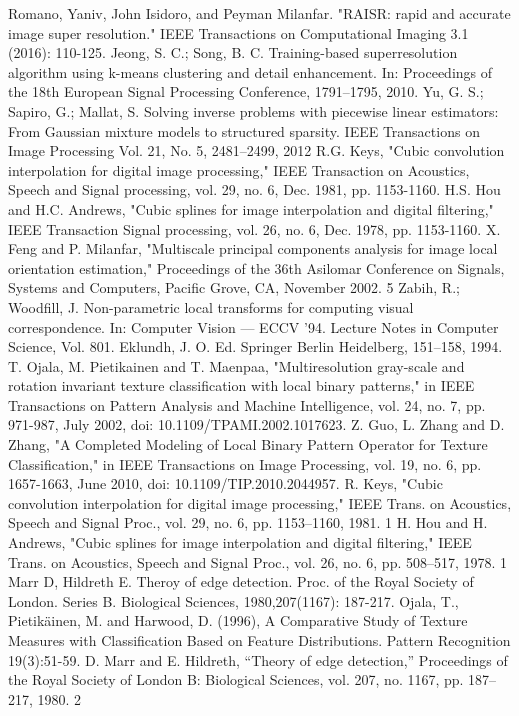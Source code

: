 \documentclass[12pt, a4paper, oneside]{ctexbook}
\begin{document}
\newpage
\begin{thebibliography}{99}
Romano, Yaniv, John Isidoro, and Peyman Milanfar. "RAISR: rapid and accurate image super resolution." IEEE Transactions on Computational Imaging 3.1 (2016): 110-125.
Jeong, S. C.; Song, B. C. Training-based superresolution algorithm using k-means clustering and detail enhancement. In: Proceedings of the 18th European Signal Processing Conference, 1791–1795, 2010.
 Yu, G. S.; Sapiro, G.; Mallat, S. Solving inverse problems with piecewise linear estimators: From Gaussian mixture models to structured sparsity. IEEE Transactions on Image Processing Vol. 21, No. 5, 2481–2499, 2012
R.G. Keys, "Cubic convolution interpolation for digital image processing," IEEE Transaction on Acoustics, Speech and Signal processing, vol. 29, no. 6, Dec. 1981, pp. 1153-1160.
H.S. Hou and H.C. Andrews, "Cubic splines for image interpolation and digital filtering," IEEE Transaction Signal processing, vol. 26, no. 6, Dec. 1978, pp. 1153-1160.
X. Feng and P. Milanfar, "Multiscale principal components analysis for image local orientation estimation," Proceedings of the 36th Asilomar Conference on Signals, Systems and Computers, Pacific Grove, CA, November 2002. 5
Zabih, R.; Woodfill, J. Non-parametric local transforms for computing visual correspondence. In: Computer Vision — ECCV '94. Lecture Notes in Computer Science, Vol. 801. Eklundh, J. O. Ed. Springer Berlin Heidelberg, 151–158, 1994.
T. Ojala, M. Pietikainen and T. Maenpaa, "Multiresolution gray-scale and rotation invariant texture classification with local binary patterns," in IEEE Transactions on Pattern Analysis and Machine Intelligence, vol. 24, no. 7, pp. 971-987, July 2002, doi: 10.1109/TPAMI.2002.1017623.
Z. Guo, L. Zhang and D. Zhang, "A Completed Modeling of Local Binary Pattern Operator for Texture Classification," in IEEE Transactions on Image Processing, vol. 19, no. 6, pp. 1657-1663, June 2010, doi: 10.1109/TIP.2010.2044957.
 R. Keys, "Cubic convolution interpolation for digital image processing," IEEE Trans. on Acoustics, Speech and Signal Proc., vol. 29, no. 6, pp. 1153–1160, 1981. 1
H. Hou and H. Andrews, "Cubic splines for image interpolation and digital filtering," IEEE Trans. on Acoustics, Speech and Signal Proc., vol. 26, no. 6, pp. 508–517, 1978. 1
Marr D, Hildreth E. Theroy of edge detection. Proc. of the Royal Society of London. Series B. Biological Sciences, 1980,207(1167): 187-217.
Ojala, T., Pietikäinen, M. and Harwood, D. (1996), A Comparative Study of Texture Measures with Classification Based on Feature Distributions. Pattern Recognition 19(3):51-59.
D. Marr and E. Hildreth, “Theory of edge detection,” Proceedings of the Royal Society of London B: Biological Sciences, vol. 207, no. 1167, pp. 187–217, 1980. 2

\end{thebibliography}
	
	
	
	
\end{document}
